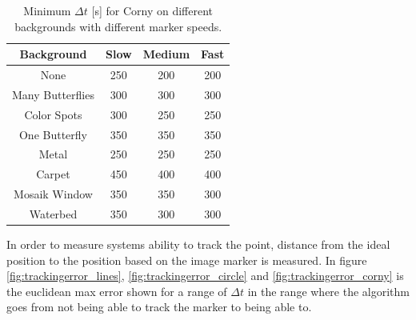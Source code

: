 
\begin{table}[H]
\center
\begin{tabular}{|c|c|c|c|}
\hline
Background       & Slow & Medium & Fast \\ \hline
None             & 250  & 200    & 200\\ \hline 
Many Butterflies & 300  & 300    & 300\\ \hline 
Color Spots      & 300  & 250    & 250\\ \hline 
One Butterfly    & 350  & 350    & 350\\ \hline 
Metal            & 250  & 250    & 250\\ \hline 
Carpet           & 450  & 400    & 400\\ \hline 
Mosaik Window    & 350  & 350    & 300\\ \hline 
Waterbed         & 350  & 300    & 300\\ \hline 
\end{tabular}
\caption{Minimum $\Delta t$ [s] for Corny on different backgrounds with different marker speeds.}
\label{tb:min_dt_corny}
\end{table}

In order to measure systems ability to track the point, distance from the ideal position to the position based on the image marker is measured.
In figure \ref{fig:trackingerror_lines}, \ref{fig:trackingerror_circle} and \ref{fig:trackingerror_corny} is the euclidean max error shown for a range of $\Delta t$ in the range where the algorithm goes from not being able to track the marker to being able to.

